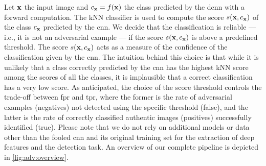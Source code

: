 


Let $\mathbf{x}$ the input image and $c_{\mathbf{x}} = f(\mathbf{x})$ the class predicted by the \gls{dcnn} with a forward computation.
The kNN classifier is used to compute the score $s(\mathbf{x},c_{\mathbf{x}})$ of the class $c_{\mathbf{x}}$ predicted by the \gls{cnn}.
We decide that the classification is reliable --- i.e., it is not an adversarial example --- if the score $s(\mathbf{x},c_{\mathbf{x}})$ is above a predefined threshold.
The score $s(\mathbf{x}, c_{\mathbf{x}})$ acts as a measure of the confidence of the classification given by the \gls{cnn}.
The intuition behind this choice is that while it is unlikely that a class correctly predicted by the \gls{cnn} has the highest kNN score among the scores of all the classes, it is implausible that a correct classification has a very low score.
As anticipated, the choice of the score threshold controls the trade-off between \acrfull{fpr} and \acrfull{tpr}, where the former is the rate of adversarial examples (negatives) not detected using the specific threshold (false), and the latter is the rate of correctly classified authentic images (positives) successfully identified (true).
Please note that we do not rely on additional models or data other than the fooled \gls{cnn} and its original training set for the extraction of deep features and the detection task.
An overview of our complete pipeline is depicted in \ref{fig:adv:overview}.


